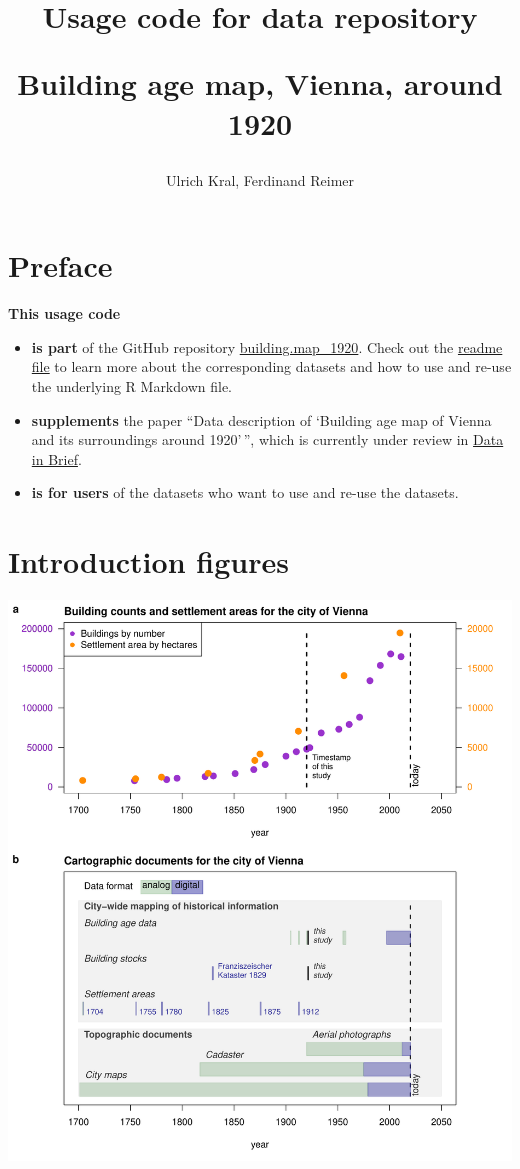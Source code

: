 \documentclass[
]{article}
\title{Usage code for data repository

Building age map, Vienna, around 1920}
\author{Ulrich Kral, Ferdinand Reimer}
\date{}
\begin{document}
\maketitle

{
\hypersetup{linkcolor=}
\setcounter{tocdepth}{2}
\tableofcontents
}
\hypertarget{preface}{%
\section*{Preface}\label{preface}}

\textbf{This usage code}

\begin{itemize}
\item
  \textbf{is part} of the GitHub repository
  \href{https://github.com/ukral/building.map_1920}{building.map\_1920}.
  Check out the
  \href{https://github.com/ukral/building.map_1920/blob/main/README.md}{readme
  file} to learn more about the corresponding datasets and how to use
  and re-use the underlying R Markdown file.
\item
  \textbf{supplements} the paper ``Data description of `Building age map
  of Vienna and its surroundings around 1920'\,'', which is currently
  under review in
  \href{https://www.journals.elsevier.com/data-in-brief}{Data in Brief}.
\item
  \textbf{is for users} of the datasets who want to use and re-use the
  datasets.
\end{itemize}

\hypertarget{introduction-figures}{%
\section{Introduction figures}\label{introduction-figures}}

\includegraphics{Usage_code_files/figure-latex/unnamed-chunk-2-1.pdf}
\end{document}
